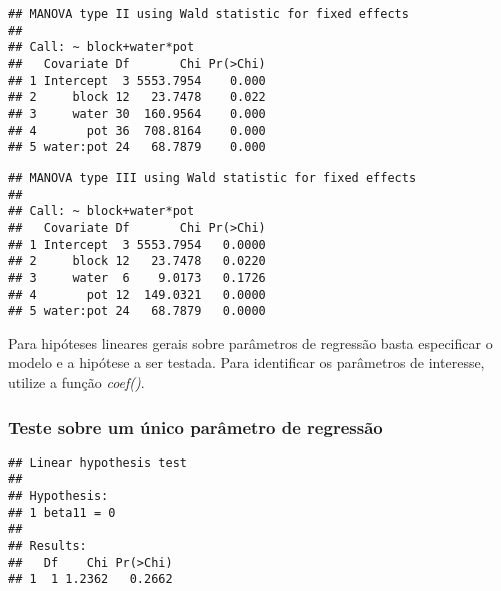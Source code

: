 
\begin{knitrout}
\color{fgcolor}\begin{kframe}
\begin{alltt}
\end{alltt}
\begin{verbatim}
## MANOVA type II using Wald statistic for fixed effects
## 
## Call: ~ block+water*pot
##   Covariate Df       Chi Pr(>Chi)
## 1 Intercept  3 5553.7954    0.000
## 2     block 12   23.7478    0.022
## 3     water 30  160.9564    0.000
## 4       pot 36  708.8164    0.000
## 5 water:pot 24   68.7879    0.000
\end{verbatim}
\end{kframe}
\end{knitrout}


\begin{knitrout}
\color{fgcolor}\begin{kframe}
\begin{alltt}
\end{alltt}
\begin{verbatim}
## MANOVA type III using Wald statistic for fixed effects
## 
## Call: ~ block+water*pot
##   Covariate Df       Chi Pr(>Chi)
## 1 Intercept  3 5553.7954   0.0000
## 2     block 12   23.7478   0.0220
## 3     water  6    9.0173   0.1726
## 4       pot 12  149.0321   0.0000
## 5 water:pot 24   68.7879   0.0000
\end{verbatim}
\end{kframe}
\end{knitrout}

Para hipóteses lineares gerais sobre parâmetros de regressão basta especificar o modelo e a hipótese a ser testada. Para identificar os parâmetros de interesse, utilize a função \emph{coef()}.

\subsubsection{Teste sobre um único parâmetro de regressão}

\begin{knitrout}
\color{fgcolor}\begin{kframe}
\begin{alltt}
\hlstd{(} 
                      \hlstd{=} \hlstd{(}\hlstd{))}
\end{alltt}
\begin{verbatim}
## Linear hypothesis test
## 
## Hypothesis:            
## 1 beta11 = 0
## 
## Results:
##   Df    Chi Pr(>Chi)
## 1  1 1.2362   0.2662
\end{verbatim}
\end{kframe}
\end{knitrout}

